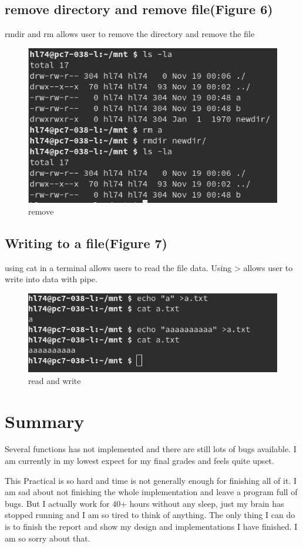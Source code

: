 \documentclass[legalpaper]{article}
\begin{document}
	\subsection*{remove directory and remove file(Figure 6)}
	rmdir and rm allows user to remove the directory and remove the file
	\begin{figure}[H]
	\centering
	\includegraphics[width = \textwidth]{rmunlink}
	\caption{remove}
	\end{figure}
	\subsection*{Writing to a file(Figure 7)}
	using cat in a terminal allows users to read the file data. Using > allows user to write into data with pipe.
	\begin{figure}[H]
	\centering
	\includegraphics[width = \textwidth]{write}
	\caption{read and write}
	\end{figure}
	\section{Summary}
	Several functions has not implemented and there are still lots of bugs available. I am currently in my lowest expect for my final grades and feels quite upset.\par
	This Practical is so hard and time is not generally enough for finishing all of it. I am sad about not finishing the whole implementation and leave a program full of bugs. But I actually work for 40+ hours without any sleep, just my brain has stopped running and I am so tired to think of anything. The only thing I can do is to finish the report and show my design and implementations I have finished. I am so sorry about that.\par
\end{document}
